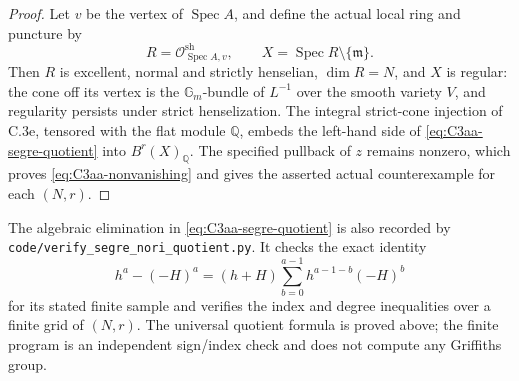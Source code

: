 \begin{proof}
Let $v$ be the vertex of $\operatorname{Spec}A$,
and define the actual local ring and puncture by
\[
 R=\mathcal O_{\operatorname{Spec}A,v}^{\mathrm{sh}},
 \qquad X=\operatorname{Spec}R\setminus\{\mathfrak m\}.
\]
Then $R$ is excellent, normal and strictly henselian,
$\dim R=N$, and $X$ is regular: the cone off its
vertex is the $\mathbb G_m$-bundle of $L^{-1}$
over the smooth variety $V$, and regularity persists
under strict henselization. The integral strict-cone
injection of C.3e, tensored with the flat module
$\mathbb Q$, embeds the left-hand side of
\eqref{eq:C3aa-segre-quotient} into $B^r(X)_{\mathbb Q}$.
The specified pullback of $z$ remains nonzero,
which proves \eqref{eq:C3aa-nonvanishing} and gives
the asserted actual counterexample for each $(N,r)$.
\end{proof}

The algebraic elimination in
\eqref{eq:C3aa-segre-quotient} is also recorded by
\texttt{code/verify\_segre\_nori\_quotient.py}. It checks
the exact identity
\[
 h^a-(-H)^a=(h+H)\sum_{b=0}^{a-1}h^{a-1-b}(-H)^b
\]
for its stated finite sample and verifies the index
and degree inequalities over a finite grid of $(N,r)$.
The universal quotient formula is proved above;
the finite program is an independent sign/index
check and does not compute any Griffiths group.
